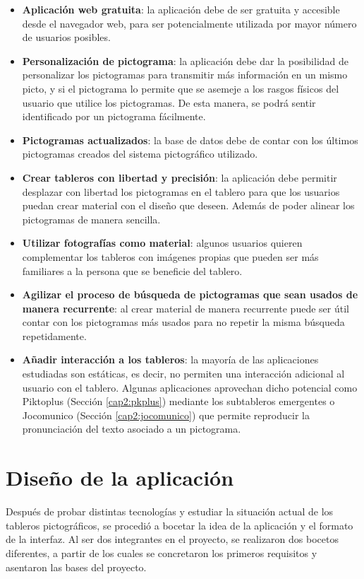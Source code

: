 \begin{itemize}
	
	\item \textbf{Aplicación web gratuita}: la aplicación debe de ser gratuita y accesible desde el navegador web, para ser potencialmente utilizada por mayor número de usuarios posibles.
	\item \textbf{Personalización de pictograma}: la aplicación debe dar la posibilidad de personalizar los pictogramas para transmitir más información en un mismo picto, y si el pictograma lo permite que se asemeje a los rasgos físicos del usuario que utilice los pictogramas. De esta manera, se podrá sentir identificado por un pictograma fácilmente. 
	\item \textbf{Pictogramas actualizados}: la base de datos debe de contar con los últimos pictogramas creados del sistema pictográfico utilizado. 
	\item \textbf{Crear tableros con libertad y precisión}: la aplicación debe permitir desplazar con libertad los pictogramas en el tablero para que los usuarios puedan crear material con el diseño que deseen. Además de poder alinear los pictogramas de manera sencilla.
	\item \textbf{Utilizar fotografías como material}: algunos usuarios quieren complementar los tableros con imágenes propias que pueden ser más familiares a la persona que se beneficie del tablero. 
	\item \textbf{Agilizar el proceso de búsqueda de pictogramas que sean usados de manera recurrente}: al crear material de manera recurrente puede ser útil contar con los pictogramas más usados para no repetir la misma búsqueda repetidamente. 
	\item \textbf{Añadir interacción a los tableros}: la mayoría de las aplicaciones estudiadas son estáticas, es decir, no permiten una interacción adicional al usuario con el tablero. Algunas aplicaciones aprovechan dicho potencial como Piktoplus (Sección \ref{cap2:pkplus}) mediante los subtableros emergentes o Jocomunico (Sección \ref{cap2:jocomunico}) que permite reproducir la pronunciación del texto asociado a un pictograma.
	
\end{itemize}






\section{Diseño de la aplicación}
\label{cap4:diseñoapp}
Después de probar distintas tecnologías y estudiar la situación actual de los tableros pictográficos, se procedió a bocetar la idea de la aplicación y el formato de la interfaz. Al ser dos integrantes en el proyecto, se realizaron dos bocetos diferentes, a partir de los cuales se concretaron los primeros requisitos y asentaron las bases del proyecto.


